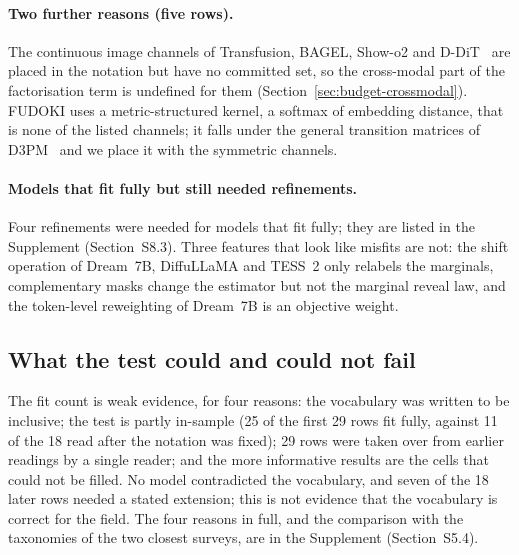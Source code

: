 \paragraph{Two further reasons (five rows).} The continuous image channels of Transfusion, BAGEL, Show-o2 and D-DiT~\cite{arXiv:2408.11039,arXiv:2505.14683,arXiv:2506.15564,arXiv:2501.00289} are placed in the notation but have no committed set, so the cross-modal part of the factorisation term is undefined for them (Section~\ref{sec:budget-crossmodal}). FUDOKI uses a metric-structured kernel, a softmax of embedding distance, that is none of the listed channels; it falls under the general transition matrices of D3PM~\cite{arXiv:2107.03006} and we place it with the symmetric channels. %

\paragraph{Models that fit fully but still needed refinements.} Four refinements were needed for models that fit fully; they are listed in the Supplement (Section~S8.3).
Three features that look like misfits are not: the shift operation of Dream~7B, DiffuLLaMA and TESS~2 only relabels the marginals, complementary masks change the estimator but not the marginal reveal law, and the token-level reweighting of Dream~7B is an objective weight. %

\subsection{What the test could and could not fail}
\label{sec:design-weak}
The fit count is weak evidence, for four reasons: the vocabulary was written to be inclusive; the test is partly in-sample (25 of the first 29 rows fit fully, against 11 of the 18 read after the notation was fixed); 29 rows were taken over from earlier readings by a single reader; and the more informative results are the cells that could not be filled. No model contradicted the vocabulary, and seven of the 18 later rows needed a stated extension; this is not evidence that the vocabulary is correct for the field. The four reasons in full, and the comparison with the taxonomies of the two closest surveys, are in the Supplement (Section~S5.4). %

